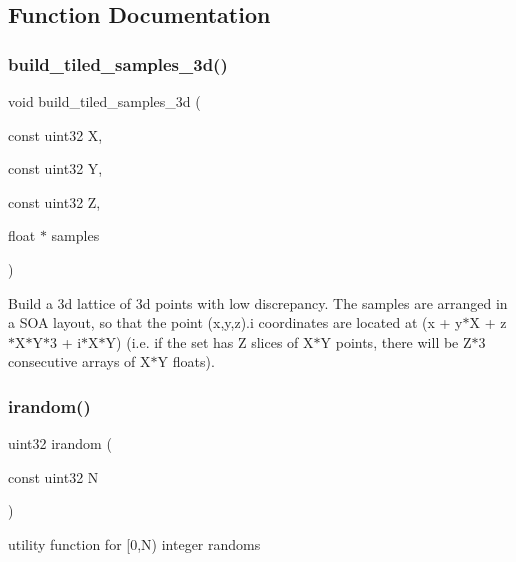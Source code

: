 \subsection{Function Documentation}
\mbox{\label{group___sampling_module_gaab55fcc60947be784a6023b83b155ad1}} 
\subsubsection{\texorpdfstring{build\+\_\+tiled\+\_\+samples\+\_\+3d()}{build\_tiled\_samples\_3d()}}
{\footnotesize\ttfamily void build\+\_\+tiled\+\_\+samples\+\_\+3d (\begin{DoxyParamCaption}\item[{const uint32}]{X,  }\item[{const uint32}]{Y,  }\item[{const uint32}]{Z,  }\item[{float $\ast$}]{samples }\end{DoxyParamCaption})\hspace{0.3cm}{\ttfamily [inline]}}

Build a 3d lattice of 3d points with low discrepancy. The samples are arranged in a S\+OA layout, so that the point (x,y,z).i coordinates are located at (x + y$\ast$X + z$\ast$\+X$\ast$\+Y$\ast$3 + i$\ast$\+X$\ast$Y) (i.\+e. if the set has Z slices of X$\ast$Y points, there will be Z$\ast$3 consecutive arrays of X$\ast$Y floats). \mbox{\label{group___sampling_module_ga60d3362a11c556fce4eaf7e9989b119a}} 
\subsubsection{\texorpdfstring{irandom()}{irandom()}}
{\footnotesize\ttfamily uint32 irandom (\begin{DoxyParamCaption}\item[{const uint32}]{N }\end{DoxyParamCaption})\hspace{0.3cm}{\ttfamily [inline]}}

utility function for \mbox{[}0,N) integer randoms \mbox{\label{group___sampling_module_gac2c10d84fc3ae4eab94ebad2c1e72e99}} 

